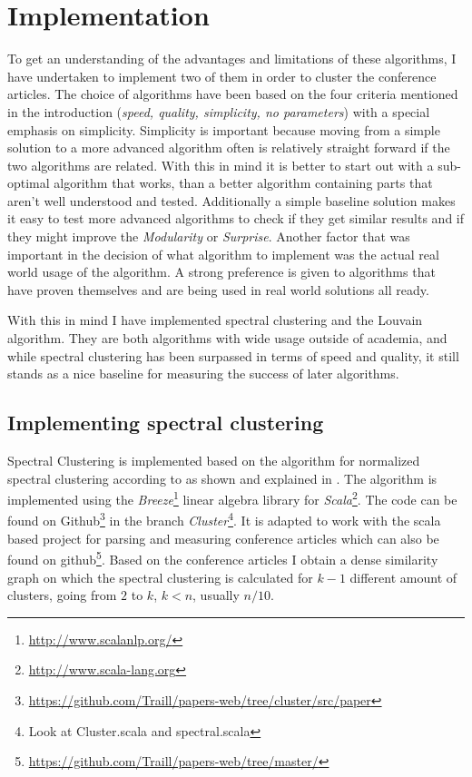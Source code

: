 \section{Implementation}
To get an understanding of the advantages and limitations of these 
algorithms, I have undertaken to implement two of them in order to 
cluster the conference articles. The choice of algorithms have been 
based on the four criteria mentioned in the introduction (\emph{speed, 
quality, simplicity, no parameters}) with a special emphasis on 
simplicity. Simplicity is important because moving from a simple 
solution to a more advanced algorithm often is relatively straight 
forward if the two algorithms are related. With this in mind it is 
better to start out with a sub-optimal algorithm that works, than a 
better algorithm containing parts that aren't well understood and 
tested.  Additionally a simple baseline solution makes it easy to test 
more advanced algorithms to check if they get similar results and if 
they might improve the \emph{Modularity} or \emph{Surprise}. Another 
factor that was important in the decision of what algorithm to implement 
was the actual real world usage of the algorithm. A strong preference is 
given to algorithms that have proven themselves and are being used in 
real world solutions all ready.

With this in mind I have implemented spectral clustering and the Louvain 
algorithm. They are both algorithms with wide usage outside of 
academia, and while spectral clustering has been surpassed in terms of 
speed and quality, it still stands as a nice baseline for measuring the 
success of later algorithms.

\subsection{Implementing spectral clustering}

Spectral Clustering is implemented based on the algorithm for normalized 
spectral clustering according to \cite{ng2002} as shown and explained in 
\cite[p. 7]{von2007}. The algorithm is implemented using the 
\emph{Breeze}\footnote{\url{http://www.scalanlp.org/}} linear algebra 
library for \emph{Scala}\footnote{\url{http://www.scala-lang.org}}.
The code can be found on 
Github\footnote{\url{https://github.com/Traill/papers-web/tree/cluster/src/paper}} 
in the branch \emph{Cluster}\footnote{Look at Cluster.scala and 
spectral.scala}.  It is adapted to work with the scala based project for 
parsing and measuring conference articles which can also be found on 
github\footnote{\url{https://github.com/Traill/papers-web/tree/master/}}.  
Based on the conference articles I obtain a dense similarity graph on 
which the spectral clustering is calculated for $k-1$ different amount 
of clusters, going from $2$ to $k$, $k < n$, usually $n/10$.

